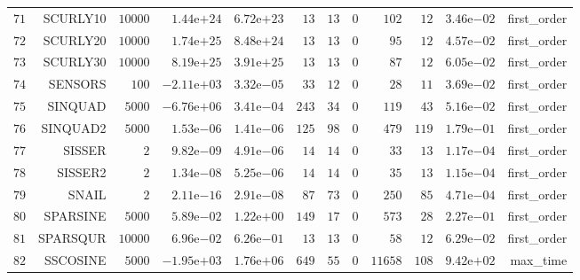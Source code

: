 \begin{longtable}{rrrrrrrrrrrr}
  \(    71\) & SCURLY10 & \( 10000\) & \( 1.44\)e\(+24\) & \( 6.72\)e\(+23\) & \(    13\) & \(    13\) & \(     0\) & \(   102\) & \(    12\) & \( 3.46\)e\(-02\) & first\_order \\
  \(    72\) & SCURLY20 & \( 10000\) & \( 1.74\)e\(+25\) & \( 8.48\)e\(+24\) & \(    13\) & \(    13\) & \(     0\) & \(    95\) & \(    12\) & \( 4.57\)e\(-02\) & first\_order \\
  \(    73\) & SCURLY30 & \( 10000\) & \( 8.19\)e\(+25\) & \( 3.91\)e\(+25\) & \(    13\) & \(    13\) & \(     0\) & \(    87\) & \(    12\) & \( 6.05\)e\(-02\) & first\_order \\
  \(    74\) & SENSORS & \(   100\) & \(-2.11\)e\(+03\) & \( 3.32\)e\(-05\) & \(    33\) & \(    12\) & \(     0\) & \(    28\) & \(    11\) & \( 3.69\)e\(-02\) & first\_order \\
  \(    75\) & SINQUAD & \(  5000\) & \(-6.76\)e\(+06\) & \( 3.41\)e\(-04\) & \(   243\) & \(    34\) & \(     0\) & \(   119\) & \(    43\) & \( 5.16\)e\(-02\) & first\_order \\
  \(    76\) & SINQUAD2 & \(  5000\) & \( 1.53\)e\(-06\) & \( 1.41\)e\(-06\) & \(   125\) & \(    98\) & \(     0\) & \(   479\) & \(   119\) & \( 1.79\)e\(-01\) & first\_order \\
  \(    77\) & SISSER & \(     2\) & \( 9.82\)e\(-09\) & \( 4.91\)e\(-06\) & \(    14\) & \(    14\) & \(     0\) & \(    33\) & \(    13\) & \( 1.17\)e\(-04\) & first\_order \\
  \(    78\) & SISSER2 & \(     2\) & \( 1.34\)e\(-08\) & \( 5.25\)e\(-06\) & \(    14\) & \(    14\) & \(     0\) & \(    35\) & \(    13\) & \( 1.15\)e\(-04\) & first\_order \\
  \(    79\) & SNAIL & \(     2\) & \( 2.11\)e\(-16\) & \( 2.91\)e\(-08\) & \(    87\) & \(    73\) & \(     0\) & \(   250\) & \(    85\) & \( 4.71\)e\(-04\) & first\_order \\
  \(    80\) & SPARSINE & \(  5000\) & \( 5.89\)e\(-02\) & \( 1.22\)e\(+00\) & \(   149\) & \(    17\) & \(     0\) & \(   573\) & \(    28\) & \( 2.27\)e\(-01\) & first\_order \\
  \(    81\) & SPARSQUR & \( 10000\) & \( 6.96\)e\(-02\) & \( 6.26\)e\(-01\) & \(    13\) & \(    13\) & \(     0\) & \(    58\) & \(    12\) & \( 6.29\)e\(-02\) & first\_order \\
  \(    82\) & SSCOSINE & \(  5000\) & \(-1.95\)e\(+03\) & \( 1.76\)e\(+06\) & \(   649\) & \(    55\) & \(     0\) & \( 11658\) & \(   108\) & \( 9.42\)e\(+02\) & max\_time \\

\end{longtable}

